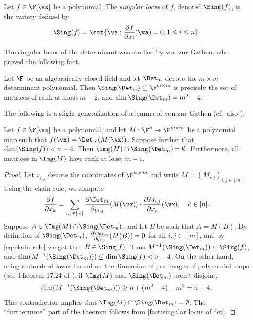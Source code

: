 \begin{definition}\label{def:singular locus}
Let $f \in \F[\vx]$ be a polynomial. The \emph{singular locus} of $f$, denoted $\Sing(f)$, is the variety defined by
\[
\Sing(f) = \set{\va : \frac{\partial f }{\partial x_i} (\va) = 0, 1 \le i \le n}. \qedhere
\]
\end{definition}

The singular locus of the determinant was studied by von zur Gathen, who proved the following fact.

\begin{fact}\label{fact:singular locus of det}
Let $\F$ be an algebraically closed field and let $\Det_m $ denote the $m \times m$ determinant polynomial. Then $\Sing(\Det_m) \subseteq \F^{m \times m}$ is precisely the set of matrices of rank at most $m-2$, and $\dim \Sing(\Det_m) = m^2 - 4$.
\end{fact}

The following is a slight generalization of a lemma of von zur Gathen (cf.\ also \cite{ABV17}).

\begin{lemma}\label{lem:image misses singular locus}
Let $f \in \F[\vx]$ be a polynomial, and let $M : \F^n \to \F^{m \times m}$ be a polynomial map such that $f(\vx) = \Det_m(M(\vx))$. Suppose further that $\dim(\Sing(f)) < n-4$. Then $\Img(M) \cap \Sing(\Det_m) = \emptyset$. Furthermore, all matrices in $\Img(M)$ have rank at least $m-1$.
\end{lemma}

\begin{proof}
Let $y_{i,j}$ denote the coordinates of $\F^{m \times m}$ and write $M = (M_{i,j})_{i ,j \in [m]}$. Using the chain rule, we compute
\begin{equation}\label{eq:chain rule}
\frac{\partial f}{\partial x_k} = \sum_{i, j \in [m]} \frac{\partial \Det_m}{\partial y_{i,j}} (M(\vx)) \cdot \frac{\partial M_{i,j}}{\partial x_k} (\vx), \quad k \in [n].
\end{equation}
Suppose $A \in \Img(M) \cap \Sing(\Det_m)$, and let $B$ be such that $A = M(B)$. By definition of $\Sing(\Det_m)$, $\frac{\partial \Det_m}{\partial y_{i,j}} (M(B)) = 0$ for all $i, j \in [m]$, and  by \eqref{eq:chain rule} we get that $B \in \Sing (f)$. Thus $M^{-1} (\Sing(\Det_m)) \subseteq \Sing(f)$, and $\dim (M^{-1} (\Sing(\Det_m))) \le  \dim \Sing(f) < n-4$. On the other hand, using a standard lower bound on the dimension of pre-images of polynomial maps (see Theorem 17.24 of \cite{HarrisAlgebraicGeometry}), if $\Img(M)$ and $\Sing(\Det_m)$ aren't disjoint,
\[
\dim(M^{-1} (\Sing(\Det_m))) \ge n + (m^2 - 4) - m^2 = n-4.
\]
This contradiction implies that $\Img(M) \cap \Sing(\Det_m) = \emptyset$. The ``furthermore'' part of the theorem follows from \autoref{fact:singular locus of det}.
\end{proof}

